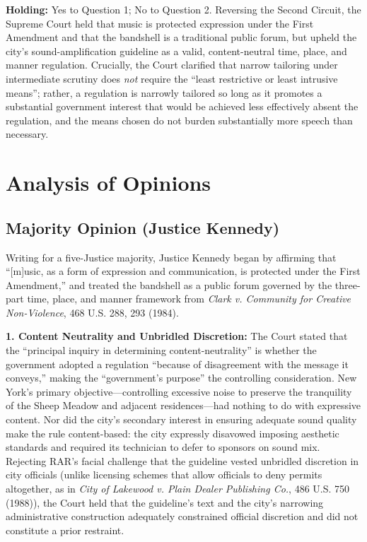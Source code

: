 \documentclass[12pt]{article}
\begin{document}
\textbf{Holding:} Yes to Question 1; No to Question 2. Reversing the Second Circuit, the Supreme Court held that music is protected expression under the First Amendment and that the bandshell is a traditional public forum, but upheld the city's sound-amplification guideline as a valid, content-neutral time, place, and manner regulation. Crucially, the Court clarified that narrow tailoring under intermediate scrutiny does \textit{not} require the ``least restrictive or least intrusive means''; rather, a regulation is narrowly tailored so long as it promotes a substantial government interest that would be achieved less effectively absent the regulation, and the means chosen do not burden substantially more speech than necessary.

\section{Analysis of Opinions}
\subsection{Majority Opinion (Justice Kennedy)}

Writing for a five-Justice majority, Justice Kennedy began by affirming that ``[m]usic, as a form of expression and communication, is protected under the First Amendment,'' and treated the bandshell as a public forum governed by the three-part time, place, and manner framework from \textit{Clark v. Community for Creative Non-Violence}, 468 U.S. 288, 293 (1984).

\textbf{1. Content Neutrality and Unbridled Discretion:} The Court stated that the ``principal inquiry in determining content-neutrality'' is whether the government adopted a regulation ``because of disagreement with the message it conveys,'' making the ``government's purpose'' the controlling consideration. New York's primary objective---controlling excessive noise to preserve the tranquility of the Sheep Meadow and adjacent residences---had nothing to do with expressive content. Nor did the city's secondary interest in ensuring adequate sound quality make the rule content-based: the city expressly disavowed imposing aesthetic standards and required its technician to defer to sponsors on sound mix. Rejecting RAR's facial challenge that the guideline vested unbridled discretion in city officials (unlike licensing schemes that allow officials to deny permits altogether, as in \textit{City of Lakewood v. Plain Dealer Publishing Co.}, 486 U.S. 750 (1988)), the Court held that the guideline's text and the city's narrowing administrative construction adequately constrained official discretion and did not constitute a prior restraint.
\end{document}
